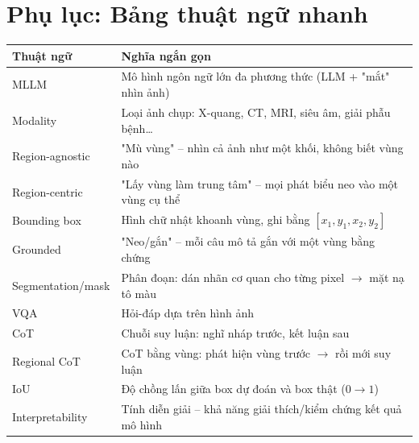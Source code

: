 \documentclass[12pt,a4paper,oneside]{extarticle}
\begin{document}
\newpage

\appendix

\section{Phụ lục: Bảng thuật ngữ nhanh}
\begin{table}[H]
\centering
\begin{tabularx}{\textwidth}{l Y}
\toprule
\textbf{Thuật ngữ} & \textbf{Nghĩa ngắn gọn} \\
\midrule
MLLM             & Mô hình ngôn ngữ lớn đa phương thức (LLM + "mắt" nhìn ảnh) \\
Modality         & Loại ảnh chụp: X-quang, CT, MRI, siêu âm, giải phẫu bệnh\ldots \\
Region-agnostic  & "Mù vùng" -- nhìn cả ảnh như một khối, không biết vùng nào \\
Region-centric   & "Lấy vùng làm trung tâm" -- mọi phát biểu neo vào một vùng cụ thể \\
Bounding box     & Hình chữ nhật khoanh vùng, ghi bằng $[x_1,y_1,x_2,y_2]$ \\
Grounded         & "Neo/gắn" -- mỗi câu mô tả gắn với một vùng bằng chứng \\
Segmentation/mask& Phân đoạn: dán nhãn cơ quan cho từng pixel $\to$ mặt nạ tô màu \\
VQA              & Hỏi-đáp dựa trên hình ảnh \\
CoT              & Chuỗi suy luận: nghĩ nháp trước, kết luận sau \\
Regional CoT     & CoT bằng vùng: phát hiện vùng trước $\to$ rồi mới suy luận \\
IoU              & Độ chồng lấn giữa box dự đoán và box thật ($0\to1$) \\
Interpretability & Tính diễn giải -- khả năng giải thích/kiểm chứng kết quả mô hình \\
\bottomrule
\end{tabularx}
\end{table}
\end{document}
